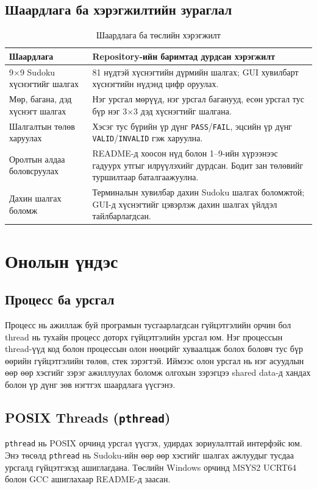 \documentclass[12pt,a4paper]{report}
\begin{document}
	\section{Шаардлага ба хэрэгжилтийн зураглал}
	\begin{table}[H]
		\centering
		\caption{Шаардлага ба төслийн хэрэгжилт}
		\small
		\begin{tabularx}{\textwidth}{|p{}|X|}
			\hline
			\textbf{Шаардлага} & \textbf{Repository-ийн баримтад дурдсан хэрэгжилт}\\
			\hline
			9$\times$9 Sudoku хүснэгтийг шалгах & 81 нүдтэй хүснэгтийн дүрмийн шалгах; GUI хувилбарт хүснэгтийн нүдэнд цифр оруулах.\\
			\hline
			Мөр, багана, дэд хүснэгт шалгах & Нэг урсгал мөрүүд, нэг урсгал баганууд, есөн урсгал тус бүр нэг 3$\times$3 дэд хүснэгтийг шалгана.\\
			\hline
			Шалгалтын төлөв харуулах & Хэсэг тус бүрийн үр дүнг \texttt{PASS}/\texttt{FAIL}, эцсийн үр дүнг \texttt{VALID}/\texttt{INVALID} гэж харуулна.\\
			\hline
			Оролтын алдаа боловсруулах & README-д хоосон нүд болон 1--9-ийн хүрээнээс гадуурх утгыг илрүүлэхийг дурдсан. Бодит зан төлөвийг туршилтаар баталгаажуулна.\\
			\hline
			Дахин шалгах боломж & Терминалын хувилбар дахин Sudoku шалгах боломжтой; GUI-д хүснэгтийг цэвэрлэж дахин шалгах үйлдэл тайлбарлагдсан.\\
			\hline
		\end{tabularx}
	\end{table}
	
	\chapter{Онолын үндэс}
	
	\section{Процесс ба урсгал}
	Процесс нь ажиллаж буй програмын тусгаарлагдсан гүйцэтгэлийн орчин бол thread нь тухайн процесс доторх гүйцэтгэлийн урсгал юм. Нэг процессын thread-үүд код болон процессын олон нөөцийг хуваалцаж болох боловч тус бүр өөрийн гүйцэтгэлийн төлөв, стек зэрэгтэй. Иймээс олон урсгал нь нэг асуудлын өөр өөр хэсгийг зэрэг ажиллуулах боломж олгохын зэрэгцээ shared data-д хандах болон үр дүнг зөв нэгтгэх шаардлага үүсгэнэ.
	
	\section{POSIX Threads (\texttt{pthread})}
	\texttt{pthread} нь POSIX орчинд урсгал үүсгэх, удирдах зориулалттай интерфэйс юм. Энэ төсөлд \texttt{pthread} нь Sudoku-ийн өөр өөр хэсгийг шалгах ажлуудыг тусдаа урсгалд гүйцэтгэхэд ашиглагдана. Төслийн Windows орчинд MSYS2 UCRT64 болон GCC ашиглахаар README-д заасан.
	
\end{document}
